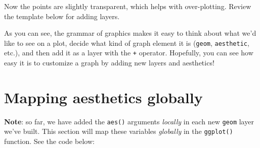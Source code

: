 \documentclass[letterpaper,12pt,twoside,]{pinp}
\begin{document}
Now the points are slightly transparent, which helps with over-plotting.
Review the template below for adding layers.

\begin{Shaded}
\begin{Highlighting}[]
\SpecialCharTok{\textless{}}\SpecialCharTok{\textgreater{}} \SpecialCharTok{\%\textgreater{}\%} 
  \NormalTok{(} \NormalTok{(} \SpecialCharTok{\textless{}}\SpecialCharTok{\textgreater{}}\NormalTok{, } \SpecialCharTok{\textless{}}\SpecialCharTok{\textgreater{}}\NormalTok{)) }\SpecialCharTok{+} 
    \ErrorTok{\textless{}}\SpecialCharTok{\textgreater{}}\NormalTok{(} \NormalTok{(}\SpecialCharTok{\textless{}}\SpecialCharTok{\textgreater{}}\NormalTok{), } \NormalTok{)}
\end{Highlighting}
\end{Shaded}

As you can see, the grammar of graphics makes it easy to think about
what we'd like to see on a plot, decide what kind of graph element it is
(\texttt{geom}, \texttt{aesthetic}, etc.), and then add it as a layer
with the \texttt{+} operator. Hopefully, you can see how easy it is to
customize a graph by adding new layers and aesthetics!

\hypertarget{mapping-aesthetics-globally}{%
\section{Mapping aesthetics
globally}\label{mapping-aesthetics-globally}}

\textbf{Note}: so far, we have added the \texttt{aes()} arguments
\emph{locally} in each new \texttt{geom} layer we've built. This section
will map these variables \emph{globally} in the \texttt{ggplot()}
function. See the code below:

\begin{Shaded}
\begin{Highlighting}[]
\OtherTok{\textless{}{-}}\SpecialCharTok{\%\textgreater{}\%} 
  \NormalTok{(} \NormalTok{(}\SpecialCharTok{+} 
              \NormalTok{(} \NormalTok{, } \NormalTok{) }\SpecialCharTok{+} 
                \NormalTok{(} \SpecialCharTok{/}\NormalTok{, } \NormalTok{)}
\end{Highlighting}
\end{Shaded}
\end{document}
